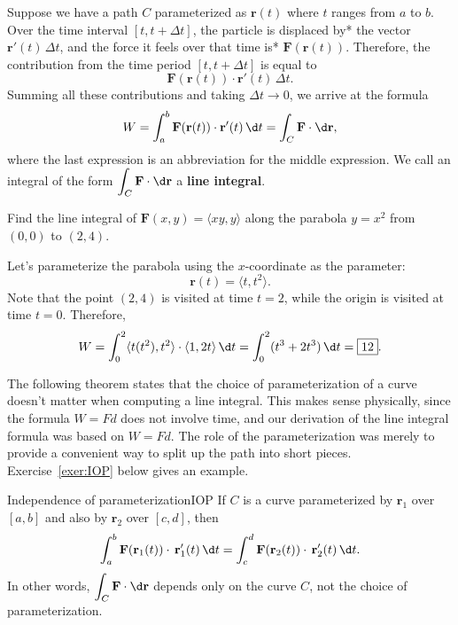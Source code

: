 \documentclass{watsonbook}
\begin{document}
Suppose we have a path $C$ parameterized as $\mathbf{r}(t)$ where $t$
ranges from $a$ to $b$. Over the time interval $[t,t+\Delta t]$, the
particle is displaced by* the vector $\mathbf{r}'(t) \, \Delta t$, and
the force it feels over that time is* $\mathbf{F}(\mathbf{r}(t))$.
Therefore, the contribution from the time period $[t, t+\Delta t]$ is
equal to 
\[
  \mathbf{F}(\mathbf{r}(t)) \cdot \mathbf{r}'(t) \, \Delta t. 
\]
Summing all these contributions and taking $\Delta t \to 0$, we arrive
at the formula
\[
  W = \int_a^b \mathbf{F}(\mathbf{r}(t)) \cdot \mathbf{r}'(t) \, {\d}t =
  \int_C \mathbf{F} \cdot \d\mathbf{r}, 
\]
where the last expression is an abbreviation for the middle
expression. We call an integral of the form $\displaystyle{\int_C \mathbf{F} \cdot
  \d\mathbf{r}}$ a \textbf{line integral}. 

\begin{example}{}{}
  Find the line integral of $\mathbf{F}(x,y) = \langle xy, y \rangle$
  along the parabola $y = x^2$ from 
  $(0,0)$ to $(2,4)$. 
\end{example}

\begin{solution}
  Let's parameterize the parabola using the $x$-coordinate as the
  parameter:
  \[
    \mathbf{r}(t) = \langle t, t^2 \rangle. 
  \]
  Note that the point $(2,4)$ is visited at time $t=2$, while the
  origin is visited at time $t=0$. Therefore, 
  \[
    W = \int_0^2 \langle t(t^2), t^2 \rangle \cdot \langle 1, 2t \rangle
    \, {\d}t = \int_0^2 (t^3 + 2t^3) \, {\d}t = \boxed{12}. 
  \]
\end{solution}

The following theorem states that the choice of parameterization of a
curve doesn't matter when computing a line integral. This makes sense
physically, since the formula $W = Fd$ does not involve time, and our
derivation of the line integral formula was based on $W=Fd$. The role
of the parameterization was merely to provide a convenient way to
split up the path into short pieces. Exercise~\ref{exer:IOP} below
gives an example.

\begin{theo}{Independence of parameterization}{IOP}
  If $C$ is a curve parameterized by $\mathbf{r}_1$ over $[a,b]$ and
  also by $\mathbf{r}_2$ over $[c,d]$, then
  \[
    \int_a^b\mathbf{F}(\mathbf{r}_1(t))  \cdot \,
    \mathbf{r}'_1(t) \, {\d}t =
    \int_c^d \mathbf{F}(\mathbf{r}_2(t))  \cdot \,
    \mathbf{r}'_2(t) \, {\d}t. 
  \]
  In other words,
  $\displaystyle{\int_C \mathbf{F} \cdot \d\mathbf{r}}$ depends only
  on the curve $C$, not the choice of parameterization.
\end{theo}
\end{document}
